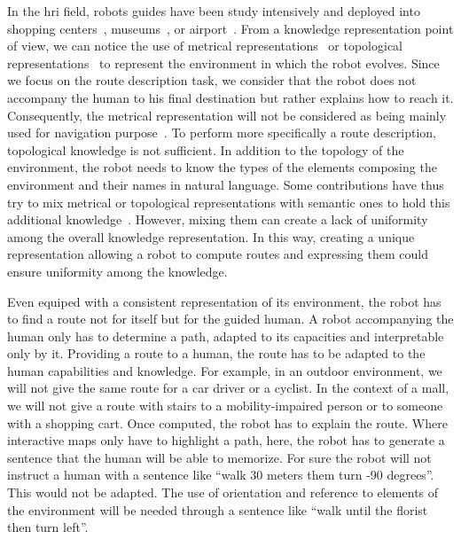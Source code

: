 In the \acrfull{hri} field, robots guides have been study intensively and deployed into shopping centers~\cite{okuno_2009_providing}, museums~\cite{burgard_1999_museum, clodic_2006_rackham, siegwart_2003_robox}, or airport~\cite{triebel_2016_spencer}. From a knowledge representation point of view, we can notice the use of metrical representations~\cite{thrun_2007_simultaneous} or topological representations~\cite{morales_2011_modeling} to represent the environment in which the robot evolves. Since we focus on the route description task, we consider that the robot does not accompany the human to his final destination but rather explains how to reach it. Consequently, the metrical representation will not be considered as being mainly used for navigation purpose~\cite{thrun_2007_simultaneous}. To perform more specifically a route description, topological knowledge is not sufficient. In addition to the topology of the environment, the robot needs to know the types of the elements composing the environment and their names in natural language. Some contributions have thus try to mix metrical or topological representations with semantic ones to hold this additional knowledge~\cite {satake_2015_should, chrastil_2014_cognitive, zender_2008_conceptual}. However, mixing them can create a lack of uniformity among the overall knowledge representation. In this way, creating a unique representation allowing a robot to compute routes and expressing them could ensure uniformity among the knowledge.

Even equiped with a consistent representation of its environment, the robot has to find a route not for itself but for the guided human. A robot accompanying the human only has to determine a path, adapted to its capacities and interpretable only by it. Providing a route to a human, the route has to be adapted to the human capabilities and knowledge. For example, in an outdoor environment, we will not give the same route for a car driver or a cyclist. In the context of a mall, we will not give a route with stairs to a mobility-impaired person or to someone with a shopping cart. Once computed, the robot has to explain the route. Where interactive maps only have to highlight a path, here, the robot has to generate a sentence that the human will be able to memorize. For sure the robot will not instruct a human with a sentence like ``walk 30 meters them turn -90 degrees''. This would not be adapted. The use of orientation and reference to elements of the environment will be needed through a sentence like ``walk until the florist then turn left''.

